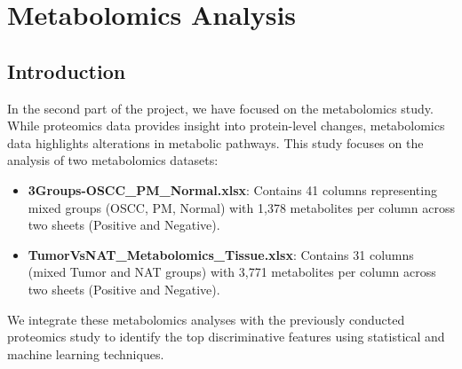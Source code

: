 \documentclass[a4paper,12pt]{article}
\begin{document}


\section{Metabolomics Analysis}
\subsection{Introduction}
In the second part of the project, we have focused on the metabolomics study. While proteomics data provides insight into protein-level changes, metabolomics data highlights alterations in metabolic pathways. This study focuses on the analysis of two metabolomics datasets:
\begin{itemize}
	\item \textbf{3Groups-OSCC\_PM\_Normal.xlsx}: Contains 41 columns representing mixed groups (OSCC, PM, Normal) with 1,378 metabolites per column across two sheets (Positive and Negative).
	\item \textbf{TumorVsNAT\_Metabolomics\_Tissue.xlsx}: Contains 31 columns (mixed Tumor and NAT groups) with 3,771 metabolites per column across two sheets (Positive and Negative).
\end{itemize}
We integrate these metabolomics analyses with the previously conducted proteomics study to identify the top discriminative features using statistical and machine learning techniques.
\end{document}
